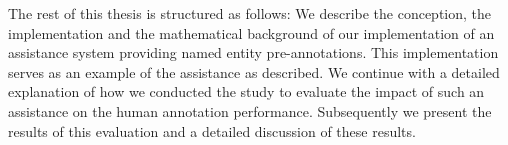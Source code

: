   The rest of this thesis is structured as follows: We describe the conception, the implementation and the mathematical background of our implementation of an assistance system providing named entity pre-annotations. This implementation serves as an example of the assistance as described. We continue with a detailed explanation of how we conducted the study to evaluate the impact of such an assistance on the human annotation performance. Subsequently we present the results of this evaluation and a detailed discussion of these results.

